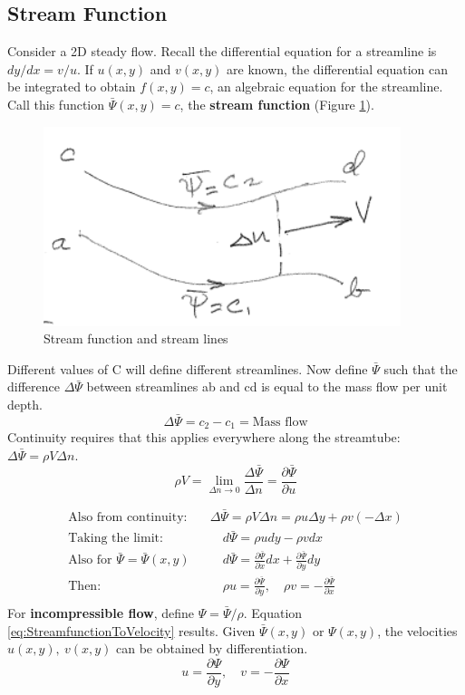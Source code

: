 \documentclass[draft=false, titlepage]{article}
\newcommand{\partialfrac}[2]{\frac{\partial #1}{\partial #2}}
\begin{document}
\subsection{Stream Function}
Consider a 2D steady flow. Recall the differential equation for a streamline is $dy/dx = v/u$. If $u(x,y)$ and $v(x,y)$ are known, the differential equation can be integrated to obtain $f(x,y) = c$, an algebraic equation for the streamline. Call this function $\bar{\Psi}(x,y) = c$, the \textbf{stream function} (Figure \ref{fig:Streamfunction}).

\begin{figure}[ht]
    \centering
    \includegraphics[width=0.4\linewidth]{Figures/streamfunction.PNG}
    \caption{Stream function and stream lines}
    \label{fig:Streamfunction}
\end{figure}

Different values of C will define different streamlines. Now define $\bar{\Psi}$ such that the difference $\Delta \bar{\Psi}$ between streamlines ab and cd is equal to the mass flow per unit depth.
\begin{equation*}
\Delta \bar{\Psi} = c_2 - c_1 = \text{Mass flow}
\end{equation*}
Continuity requires that this applies everywhere along the streamtube: $\Delta \bar{\Psi} = \rho V \Delta n$.
\begin{equation*}
    \rho V = \lim\limits_{\Delta n \rightarrow 0} \frac{\Delta \bar{\Psi}}{\Delta n} = \partialfrac{\bar{\Psi}}{u}
\end{equation*}

\begin{align*}
\text{Also from continuity:} \quad & \Delta \bar{\Psi} = \rho V \Delta n = \rho u \Delta y + \rho v(-\Delta x)\\
\text{Taking the limit:} & \quad d\bar{\Psi} = \rho u dy - \rho v dx\\
\text{Also for } \bar{\Psi} = \bar{\Psi} (x,y) & \quad d\bar{\Psi} = \partialfrac{\bar{\Psi}}{x}dx + \partialfrac{\bar{\Psi}}{y} dy \\
\text{Then:} & \quad \rho u = \partialfrac{\bar{\Psi}}{y},\quad \rho v = -\partialfrac{\bar{\Psi}}{x} \\
\end{align*}
For \textbf{incompressible flow}, define $\Psi = \bar{\Psi}/\rho$. Equation \ref{eq:StreamfunctionToVelocity} results. Given $\bar{\Psi}(x,y)$ or $\Psi(x,y)$, the velocities $u(x,y),\ v(x,y)$ can be obtained by differentiation.
\begin{equation}
    u = \partialfrac{\Psi}{y},\quad v = -\partialfrac{\Psi}{x}
    \label{eq:StreamfunctionToVelocity}
\end{equation}
\end{document}
